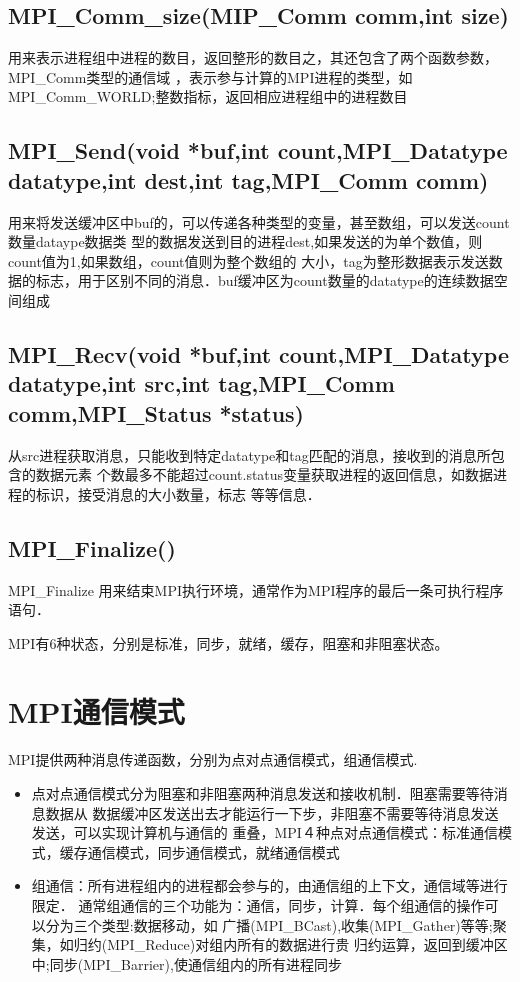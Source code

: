 \subsection{MPI\_Comm\_size(MIP\_Comm comm,int size)}
    用来表示进程组中进程的数目，返回整形的数目之，其还包含了两个函数参数，MPI\_Comm类型的通信域
，表示参与计算的MPI进程的类型，如MPI\_Comm\_WORLD;整数指标，返回相应进程组中的进程数目
\subsection{MPI\_Send(void *buf,int count,MPI\_Datatype datatype,int dest,int tag,MPI\_Comm comm)}
    用来将发送缓冲区中buf的，可以传递各种类型的变量，甚至数组，可以发送count数量dataype数据类
型的数据发送到目的进程dest,如果发送的为单个数值，则count值为1,如果数组，count值则为整个数组的
大小，tag为整形数据表示发送数据的标志，用于区别不同的消息．buf缓冲区为count数量的datatype的连续数据空间组成
\subsection{MPI\_Recv(void *buf,int count,MPI\_Datatype datatype,int src,int tag,MPI\_Comm comm,MPI\_Status *status)}
    从src进程获取消息，只能收到特定datatype和tag匹配的消息，接收到的消息所包含的数据元素
个数最多不能超过count.status变量获取进程的返回信息，如数据进程的标识，接受消息的大小数量，标志
等等信息．
\subsection{MPI\_Finalize()}
    MPI\_Finalize 用来结束MPI执行环境，通常作为MPI程序的最后一条可执行程序语句．

MPI有6种状态，分别是标准，同步，就绪，缓存，阻塞和非阻塞状态。

\section{MPI通信模式}
    MPI提供两种消息传递函数，分别为点对点通信模式，组通信模式.
    \begin{itemize} 
    \item 点对点通信模式分为阻塞和非阻塞两种消息发送和接收机制．阻塞需要等待消息数据从
数据缓冲区发送出去才能运行一下步，非阻塞不需要等待消息发送发送，可以实现计算机与通信的
重叠，MPI４种点对点通信模式：标准通信模式，缓存通信模式，同步通信模式，就绪通信模式
    \item 组通信：所有进程组内的进程都会参与的，由通信组的上下文，通信域等进行限定．
通常组通信的三个功能为：通信，同步，计算．每个组通信的操作可以分为三个类型:数据移动，如
广播(MPI\_BCast),收集(MPI\_Gather)等等;聚集，如归约(MPI\_Reduce)对组内所有的数据进行贵
归约运算，返回到缓冲区中;同步(MPI\_Barrier),使通信组内的所有进程同步
    \end{itemize} 
    
